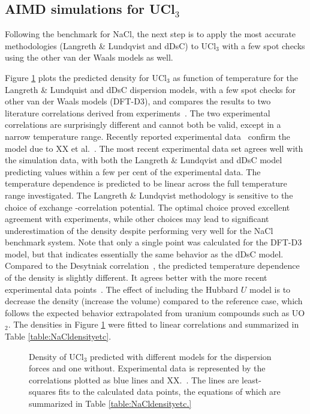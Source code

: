 \documentclass[preprint,3p,10pt,twocolumn,number,sort&compress]{elsarticle}
\begin{document}
\subsection{AIMD simulations for UCl$_3$}
Following the benchmark for NaCl, the next step is to apply the most accurate methodologies (Langreth \& Lundqvist and dDsC) to UCl$_3$ with a few spot checks using the other van der Waals models as well. 

Figure \ref{fig:UCl3density} plots the predicted density for UCl$_3$ as function of temperature for the Langreth \& Lundquist and dDsC dispersion models, with a few spot checks for other van der Waals models (DFT-D3), and compares the results to two literature correlations derived from experiments~\cite{}. The two experimental correlations are surprisingly different and cannot both be valid, except in a narrow temperature range. Recently reported experimental data~\cite{} confirm the model due to XX et al.~\cite{}. The most recent experimental data set agrees well with the simulation data, with both the Langreth \& Lundqvist and dDsC model predicting values within a few per cent of the experimental data. The temperature dependence is predicted to be linear across the full temperature range investigated. The Langreth \& Lundqvist methodology is sensitive to the choice of exchange -correlation potential. The optimal choice proved excellent agreement with experiments, while other choices may lead to significant underestimation of the density despite performing very well for the NaCl benchmark system. Note that only a single point was calculated for the DFT-D3 model, but that indicates essentially the same behavior as the dDsC model.  Compared to the Desytniak correlation~\cite{},  the predicted temperature dependence of the density is slightly different. It agrees better with the more recent experimental data points~\cite{XX}. The effect of including the Hubbard $U$  model is to decrease the density (increase the volume) compared to the reference case, which follows the expected behavior extrapolated from uranium compounds such as UO$_2$. The densities in Figure \ref{fig:UCl3density} were fitted to linear correlations and summarized in Table \ref{table:NaCldensityetc}.

\begin{figure}[htb]
\centering
\caption{Density of UCl$_3$ predicted with different models for the dispersion forces and one without. Experimental data is represented by the correlations plotted as blue lines and XX.~\cite{}. The lines are least-squares fits to the calculated data points, the equations of which are summarized in Table \ref{table:NaCldensityetc.}} 
\label{fig:UCl3density}
\end{figure}
 
\end{document}
